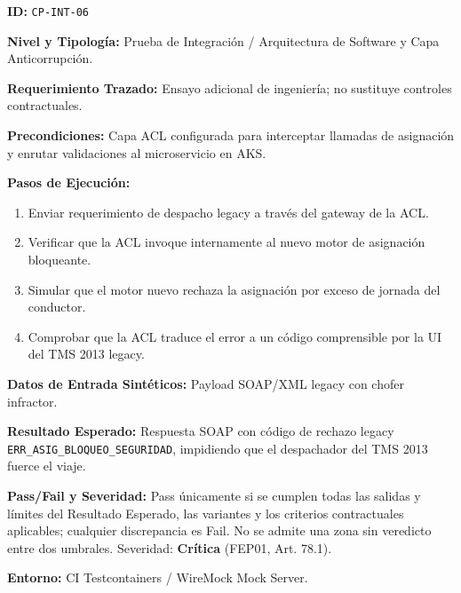 \par\noindent\textbf{ID:} \texttt{C\allowbreak{}P\allowbreak{}-\allowbreak{}I\allowbreak{}N\allowbreak{}T\allowbreak{}-\allowbreak{}0\allowbreak{}6\allowbreak{}}\par
\par\noindent\textbf{Nivel y Tipología:} Prueba de Integración / Arquitectura de Software y Capa Anticorrupción.\par
\par\noindent\textbf{Requerimiento Trazado:} Ensayo adicional de ingeniería; no sustituye controles contractuales.\par
\par\noindent\textbf{Precondiciones:} Capa ACL configurada para interceptar llamadas de asignación y enrutar validaciones al microservicio en AKS.\par
\par\noindent\textbf{Pasos de Ejecución:} \par
\begin{enumerate}
\item Enviar requerimiento de despacho legacy a través del gateway de la ACL.
\item Verificar que la ACL invoque internamente al nuevo motor de asignación bloqueante.
\item Simular que el motor nuevo rechaza la asignación por exceso de jornada del conductor.
\item Comprobar que la ACL traduce el error a un código comprensible por la UI del TMS 2013 legacy.
\end{enumerate}
\par\noindent\textbf{Datos de Entrada Sintéticos:} Payload SOAP/XML legacy con chofer infractor.\par
\par\noindent\textbf{Resultado Esperado:} Respuesta SOAP con código de rechazo legacy \texttt{E\allowbreak{}R\allowbreak{}R\allowbreak{}\_\allowbreak{}A\allowbreak{}S\allowbreak{}I\allowbreak{}G\allowbreak{}\_\allowbreak{}B\allowbreak{}L\allowbreak{}O\allowbreak{}Q\allowbreak{}U\allowbreak{}E\allowbreak{}O\allowbreak{}\_\allowbreak{}S\allowbreak{}E\allowbreak{}G\allowbreak{}U\allowbreak{}R\allowbreak{}I\allowbreak{}D\allowbreak{}A\allowbreak{}D\allowbreak{}}, impidiendo que el despachador del TMS 2013 fuerce el viaje.\par
\par\noindent\textbf{Pass/Fail y Severidad:} Pass únicamente si se cumplen todas las salidas y límites del Resultado Esperado, las variantes y los criterios contractuales aplicables; cualquier discrepancia es Fail. No se admite una zona sin veredicto entre dos umbrales. Severidad: \textbf{Crítica} (FEP01, Art. 78.1).\par
\par\noindent\textbf{Entorno:} CI Testcontainers / WireMock Mock Server.\par






